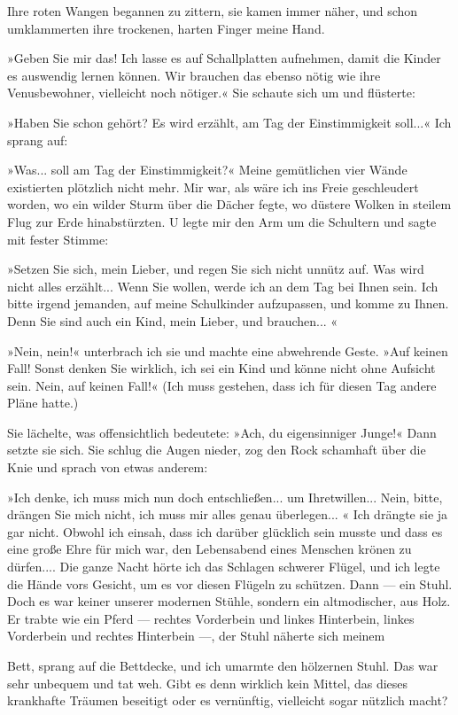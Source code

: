 Ihre roten Wangen begannen zu zittern, sie kamen immer näher, und
schon umklammerten ihre trockenen, harten Finger meine Hand.

»Geben Sie mir das! Ich lasse es auf Schallplatten aufnehmen, damit
die Kinder es auswendig lernen können. Wir brauchen das ebenso
nötig wie ihre Venusbewohner, vielleicht noch nötiger.« Sie schaute
sich um und flüsterte:

»Haben Sie schon gehört? Es wird erzählt, am Tag der Einstimmigkeit
soll...« Ich sprang auf:

»Was... soll am Tag der Einstimmigkeit?« Meine gemütlichen vier
Wände existierten plötzlich nicht mehr. Mir war, als wäre ich ins
Freie geschleudert worden, wo ein wilder Sturm über die Dächer
fegte, wo düstere Wolken in steilem Flug zur Erde hinabstürzten. U
legte mir den Arm um die Schultern und sagte mit fester Stimme:

»Setzen Sie sich, mein Lieber, und regen Sie sich nicht unnütz auf.
Was wird nicht alles erzählt... Wenn Sie wollen, werde ich an dem
Tag bei Ihnen sein. Ich bitte irgend jemanden, auf meine
Schulkinder aufzupassen, und komme zu Ihnen. Denn Sie sind auch ein
Kind, mein Lieber, und brauchen... «

»Nein, nein!« unterbrach ich sie und machte eine abwehrende Geste.
»Auf keinen Fall! Sonst denken Sie wirklich, ich sei ein Kind und
könne nicht ohne Aufsicht sein. Nein, auf keinen Fall!« (Ich muss
gestehen, dass ich für diesen Tag andere Pläne hatte.)

Sie lächelte, was offensichtlich bedeutete: »Ach, du eigensinniger
Junge!« Dann setzte sie sich. Sie schlug die Augen nieder, zog den
Rock schamhaft über die Knie und sprach von etwas anderem:

»Ich denke, ich muss mich nun doch entschließen... um
Ihretwillen... Nein, bitte, drängen Sie mich nicht, ich muss mir
alles genau überlegen... « Ich drängte sie ja gar nicht. Obwohl ich
einsah, dass ich darüber glücklich sein musste und dass es eine
große Ehre für mich war, den Lebensabend eines Menschen krönen zu
dürfen.... Die ganze Nacht hörte ich das Schlagen schwerer Flügel,
und ich legte die Hände vors Gesicht, um es vor diesen Flügeln zu
schützen. Dann — ein Stuhl. Doch es war keiner unserer modernen
Stühle, sondern ein altmodischer, aus Holz. Er trabte wie ein Pferd
— rechtes Vorderbein und linkes Hinterbein, linkes Vorderbein und
rechtes Hinterbein —, der Stuhl näherte sich meinem

Bett, sprang auf die Bettdecke, und ich umarmte den hölzernen
Stuhl. Das war sehr unbequem und tat weh. Gibt es denn wirklich
kein Mittel, das dieses krankhafte Träumen beseitigt oder es
vernünftig, vielleicht sogar nützlich macht?

